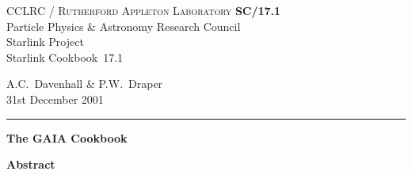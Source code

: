 \documentclass[twoside,11pt]{article}
\newcommand{\stardoccategory}  {Starlink Cookbook}
\newcommand{\stardocinitials}  {SC}
\newcommand{\stardocnumber}    {17.1}
\newcommand{\stardocauthors}   {A.C.~Davenhall \& P.W.~Draper}
\newcommand{\stardocdate}      {31st December 2001}
\newcommand{\stardoctitle}     {The GAIA Cookbook}
\newcommand{\stardocname}{\stardocinitials /\stardocnumber}
\newenvironment{latexonly}{}{}
\begin{document}
\thispagestyle{empty}

\begin{latexonly}
   CCLRC / \textsc{Rutherford Appleton Laboratory} \hfill \textbf{\stardocname}\\
   {\large Particle Physics \& Astronomy Research Council}\\
   {\large Starlink Project\\}
   {\large \stardoccategory\ \stardocnumber}
   \begin{flushright}
   \stardocauthors\\
   \stardocdate
   \end{flushright}
   \vspace{-4mm}
   \rule{\textwidth}{0.5mm}
   \vspace{5mm}
   \begin{center}
   {\Huge\textbf{\stardoctitle \\ [2.5ex]}}
   \end{center}
   \vspace{5mm}


   \vspace{10mm}
   \begin{center}
      {\Large\textbf{Abstract}}
   \end{center}
\end{latexonly}
\end{document}
